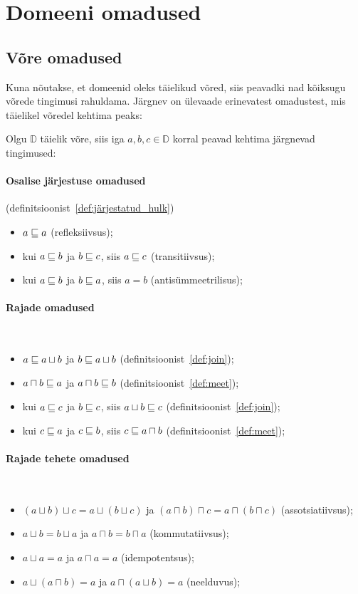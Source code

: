 \documentclass[../thesis.tex]{subfiles}
\begin{document}
\section{Domeeni omadused}

\subsection{Võre omadused}
Kuna nõutakse, et domeenid oleks täielikud võred, siis peavadki nad kõiksugu võrede tingimusi rahuldama. Järgnev on ülevaade erinevatest omadustest, mis täielikel võredel kehtima peaks:

\noindent
Olgu $\mathbb{D}$ täielik võre, siis iga $a, b, c \in \mathbb{D}$ korral peavad kehtima järgnevad tingimused:

\paragraph{Osalise järjestuse omadused} (definitsioonist~\ref{def:järjestatud_hulk})
\begin{itemize}[nosep]
	\item $a \sqsubseteq a$ (refleksiivsus);
	\item kui $a \sqsubseteq b$ ja $b \sqsubseteq c$, siis $a \sqsubseteq c$ (transitiivsus);
	\item kui $a \sqsubseteq b$ ja $b \sqsubseteq a$, siis $a = b$ (antisümmeetrilisus);
\end{itemize}

\paragraph{Rajade omadused}~\cite{might_orders}
\begin{itemize}[nosep]
	\item $a \sqsubseteq a \sqcup b$ ja $b \sqsubseteq a \sqcup b$ (definitsioonist~\ref{def:join});
	\item $a \sqcap b \sqsubseteq a$ ja $a \sqcap b \sqsubseteq b$ (definitsioonist~\ref{def:meet});
	\item kui $a \sqsubseteq c$ ja $b \sqsubseteq c$, siis $a \sqcup b \sqsubseteq c$ (definitsioonist~\ref{def:join});
	\item kui $c \sqsubseteq a$ ja $c \sqsubseteq b$, siis $c \sqsubseteq a \sqcap b$ (definitsioonist~\ref{def:meet});
\end{itemize}

\paragraph{Rajade tehete omadused}~\cites[6]{laan_voreteooria}[39]{davey_lattices}
\begin{itemize}[nosep]
	\item $(a \sqcup b) \sqcup c = a \sqcup (b \sqcup c)$ ja $(a \sqcap b) \sqcap c = a \sqcap (b \sqcap c)$ (assotsiatiivsus);
	\item $a \sqcup b = b \sqcup a$ ja $a \sqcap b = b \sqcap a$ (kommutatiivsus);
	\item $a \sqcup a = a$ ja $a \sqcap a = a$ (idempotentsus);
	\item $a \sqcup (a \sqcap b) = a$ ja $a \sqcap (a \sqcup b) = a$ (neelduvus);
\end{itemize}
\end{document}
